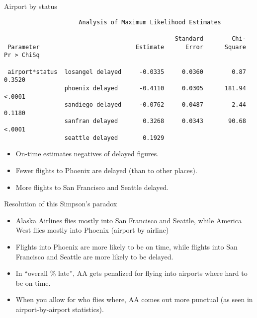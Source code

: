 \documentclass[pdf]{prosper}
\begin{document}
\begin{slide}{Airport by status}

{\scriptsize
\begin{verbatim}
                     Analysis of Maximum Likelihood Estimates

                                                Standard        Chi-
 Parameter                           Estimate      Error      Square  Pr > ChiSq

 airport*status  losangel delayed     -0.0335     0.0360        0.87  0.3520
                 phoenix delayed      -0.4110     0.0305      181.94  <.0001
                 sandiego delayed     -0.0762     0.0487        2.44  0.1180
                 sanfran delayed       0.3268     0.0343       90.68  <.0001
                 seattle delayed       0.1929
\end{verbatim}
}

\begin{itemize}
\item On-time estimates negatives of delayed figures.
\item Fewer flights to Phoenix are delayed (than to other places).
\item More flights to San Francisco and Seattle delayed.
\end{itemize}

  
\end{slide}

\begin{slide}{Resolution of this Simpson's paradox}

  \begin{itemize}
  \item Alaska Airlines flies mostly into San Francisco and Seattle, while America West flies mostly into Phoenix (airport by airline)
  \item Flights into Phoenix are more likely to be on time, while flights into San Francisco and Seattle are more likely to be delayed.
  \item In ``overall \% late'', AA gets penalized for flying into airports where hard to be on time.
  \item When you allow for who flies where, AA comes out more punctual (as seen in airport-by-airport statistics).
  \end{itemize}
  
\end{slide}
\end{document}
